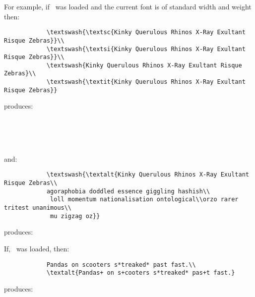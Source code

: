 \documentclass[11pt,british]{article}
\begin{document}
	For example, if \ was loaded and the current font is of standard width and weight then:
		\begin{verbatim}
			\textswash{\textsc{Kinky Querulous Rhinos X-Ray Exultant Risque Zebras}}\\
			\textswash{\textsi{Kinky Querulous Rhinos X-Ray Exultant Risque Zebras}}\\
			\textswash{Kinky Querulous Rhinos X-Ray Exultant Risque Zebras}\\
			\textswash{\textit{Kinky Querulous Rhinos X-Ray Exultant Risque Zebras}}
		\end{verbatim}
		produces:
		\begin{center}
		 	\\
			\\
			\\
		\end{center}
		and:
		\begin{verbatim}
			\textswash{\textalt{Kinky Querulous Rhinos X-Ray Exultant Risque Zebras\\
			agoraphobia doddled essence giggling hashish\\
			 loll momentum nationalisation ontological\\orzo rarer tritest unanimous\\
			 mu zigzag oz}}
		\end{verbatim}
		produces:
		\begin{center}
		\end{center}
	If, \ was loaded, then:
		\begin{verbatim}
			Pandas on scooters s*treaked* past fast.\\
			\textalt{Pandas+ on s+cooters s*treaked* pas+t fast.}
		\end{verbatim}
	produces:
		\begin{center}	
		\end{center}					
	
\end{document}
